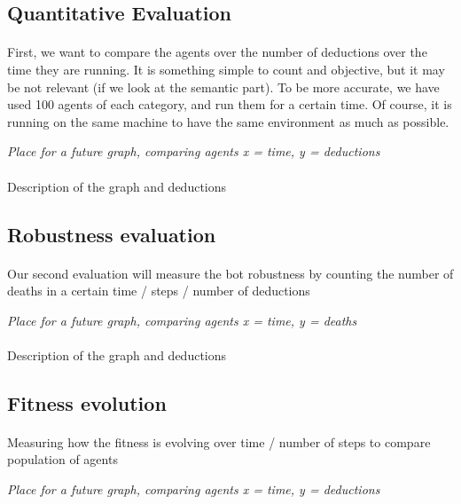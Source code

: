 \documentclass{article}
\begin{document}
	\subsection{Quantitative Evaluation}
		\paragraph{}
			First, we want to compare the agents over the number of deductions over the time they are running.
			It is something simple to count and objective, but it may be not relevant (if we look at the semantic part).
			To be more accurate, we have used 100 agents of each category, and run them for a certain time.
			Of course, it is running on the same machine to have the same environment as much as possible.
		\begin{center}
			\textit{Place for a future graph, comparing agents x = time, y = deductions}
		\end{center}
		\paragraph{}
			Description of the graph and deductions
	\subsection{Robustness evaluation}
		\paragraph{}
			Our second evaluation will measure the bot robustness by counting the number of deaths
			in a certain time / steps / number of deductions
		\begin{center}
			\textit{Place for a future graph, comparing agents x = time, y = deaths}
		\end{center}
		\paragraph{}
			Description of the graph and deductions
	\subsection{Fitness evolution}
		\paragraph{}
			Measuring how the fitness is evolving over time / number of steps to compare population of agents
		\begin{center}
			\textit{Place for a future graph, comparing agents x = time, y = deductions}
		\end{center}
\end{document}

